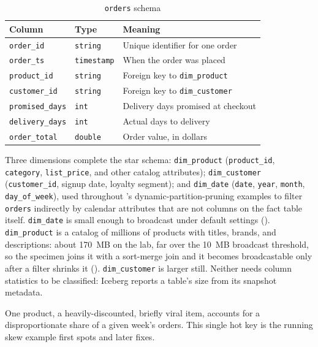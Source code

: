 \begin{table}[htbp]
\centering
\caption{\texttt{orders} schema}
\label{tab:refenv-orders-schema}
\begin{tabular}{@{}lll@{}}
\toprule
\textbf{Column} & \textbf{Type} & \textbf{Meaning} \\
\midrule
\texttt{order\_id} & \texttt{string} & Unique identifier for one order \\
\texttt{order\_ts} & \texttt{timestamp} & When the order was placed \\
\texttt{product\_id} & \texttt{string} & Foreign key to \texttt{dim\_product} \\
\texttt{customer\_id} & \texttt{string} & Foreign key to \texttt{dim\_customer} \\
\texttt{promised\_days} & \texttt{int} & Delivery days promised at checkout \\
\texttt{delivery\_days} & \texttt{int} & Actual days to delivery \\
\texttt{order\_total} & \texttt{double} & Order value, in dollars \\
\bottomrule
\end{tabular}
\end{table}

Three dimensions complete the star schema: \texttt{dim\_product}
(\texttt{product\_id}, \texttt{category}, \texttt{list\_price}, and other
catalog attributes); \texttt{dim\_customer} (\texttt{customer\_id}, signup
date, loyalty segment); and \texttt{dim\_date} (\texttt{date},
\texttt{year}, \texttt{month}, \texttt{day\_of\_week}), used throughout
's dynamic-partition-pruning examples to filter
\texttt{orders} indirectly by calendar attributes that are not columns on
the fact table itself. \texttt{dim\_date} is small enough to broadcast under default
settings (). \texttt{dim\_product} is a catalog of
millions of products with titles, brands, and descriptions: about 170~MB on the
lab, far over the 10~MB broadcast threshold, so the specimen joins it with a
sort-merge join and it becomes broadcastable only after a filter shrinks it
(). \texttt{dim\_customer} is larger still. Neither
needs column statistics to be classified: Iceberg reports a table's size from
its snapshot metadata.

\begin{note}
One product, a heavily-discounted, briefly viral item, accounts for a
disproportionate share of a given week's orders. This single hot key is the
running skew example  first spots and
 later fixes.
\end{note}

